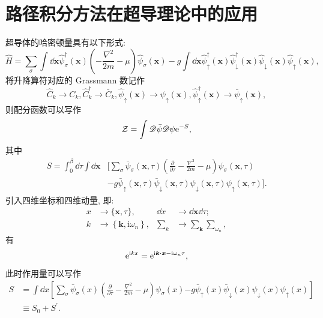 \section{路径积分方法在超导理论中的应用}
超导体的哈密顿量具有以下形式:
\begin{equation}
\hat{H}=\sum_\sigma \int \dd \boldsymbol{x}\hat{\psi}_{\sigma}^{\dagger}(\boldsymbol{x})\left(-\frac{\nabla^{2}}{2 m}-\mu\right) \hat{\psi}^{}_{\sigma}(\boldsymbol{x})-g \int \dd \boldsymbol{x} \hat{\psi}_{\uparrow}^{\dagger}(\boldsymbol{x}) \hat{\psi}_{\downarrow}^{\dagger}(\boldsymbol{x}) \hat{\psi}^{}_{\downarrow}(\boldsymbol{x}) \hat{\psi}^{}_{\uparrow}(\boldsymbol{x}),
\end{equation}
将升降算符对应的 Grassmann 数记作
\begin{equation}
\hat{C}^{}_{k} \rightarrow C^{}_{k}, \hat{C}_{k}^{\dagger} \rightarrow \bar{C}^{}_{k}, \hat{\psi}^{}_{\uparrow}(\boldsymbol{x}) \rightarrow \psi^{}_{\uparrow}(\boldsymbol{x}), \hat{\psi}_{\uparrow}^{\dagger}(\boldsymbol{x}) \rightarrow \bar{\psi}^{}_{\uparrow}(\boldsymbol{x}) ,
\end{equation}
则配分函数可以写作
\begin{equation}
\mathcal{Z}=\int \mathscr{D}\bar{\psi}\mathscr{D}\psi \mathrm{e}^{-S},
\end{equation}
其中
\begin{align}
S=\int_{0}^{\beta} \dd \tau \int \dd \boldsymbol{x}&\Bigg[\sum_{\sigma} \bar{\psi}_{\sigma}(\boldsymbol{x}, \tau)\left(\frac{\partial}{\partial \tau}-\frac{\nabla^{2}}{2 m}-\mu\right) \psi_{\sigma}(\boldsymbol{x}, \tau)\nonumber\\
&-g \bar{\psi}_{\uparrow}(\boldsymbol{x}, \tau) \bar{\psi}_{\downarrow}(\boldsymbol{x}, \tau) \psi_{\downarrow}(\boldsymbol{x}, \tau) \psi_{\uparrow}(\boldsymbol{x}, \tau)\Bigg].
\end{align}
引入四维坐标和四维动量, 即:
\begin{align}
x &\rightarrow\{\boldsymbol{x}, \tau\}, &\dd x &\rightarrow \dd \boldsymbol{x} \dd \tau;\nonumber\\
k &\rightarrow\left\{\boldsymbol k, \mathrm i \omega_{n}\right\}, &\sum_{k} &\rightarrow \sum_{\boldsymbol k} \sum_{\omega_{n}},
\end{align}
有
\begin{equation}
\mathrm{e}^{\mathrm i k x}=\mathrm{e}^{\mathrm i \boldsymbol{k} \cdot \boldsymbol{x}-\mathrm i \omega_{n} \tau},
\end{equation}
此时作用量可以写作
\begin{align}
S&=\int \dd x\left[{\sum_{\sigma} \bar{\psi}_{\sigma}(x)\left(\frac{\partial}{\partial \tau}-\frac{\nabla^{2}}{2 m}-\mu\right) \psi_{\sigma}(x)}{-g \bar{\psi}_{\uparrow}(x) \bar{\psi}_{\downarrow}(x) \psi_{\downarrow}(x) \psi_{\uparrow}(x)}\right]\nonumber\\
&\equiv S_0+S^\prime.
\end{align}
